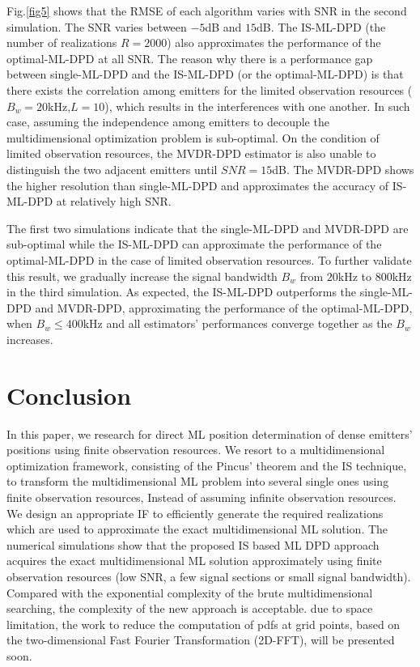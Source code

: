 \documentclass[review]{elsarticle}
\begin{document}
Fig.\ref{fig5} shows that the RMSE of each algorithm varies with SNR in the second simulation. The SNR varies between $-5$dB and $15$dB. The IS-ML-DPD (the number of realizations $R=2000$) also approximates the performance of the optimal-ML-DPD at all SNR. The reason why there is a performance gap between single-ML-DPD and the IS-ML-DPD (or the optimal-ML-DPD) is that there exists the correlation among emitters for the limited observation resources ($B_w=20$kHz,$L=10$), which results in the interferences with one another. In such case, assuming the independence among emitters to decouple the multidimensional optimization problem is sub-optimal. On the condition of limited observation resources, the MVDR-DPD estimator is also unable to distinguish the two adjacent emitters until $SNR= 15$dB. The MVDR-DPD shows the higher resolution than single-ML-DPD and approximates the accuracy of IS-ML-DPD at relatively high SNR.

The first two simulations indicate that the single-ML-DPD and MVDR-DPD are sub-optimal while the IS-ML-DPD can approximate the performance of the optimal-ML-DPD in the case of limited observation resources. To further validate this result, we gradually increase the signal bandwidth $B_w$ from $20$kHz to $800$kHz in the third simulation. As expected, the IS-ML-DPD outperforms the single-ML-DPD and MVDR-DPD, approximating the performance of the optimal-ML-DPD, when $B_w\leq400$kHz and all estimators' performances converge together as the $B_w$ increases.

\section{Conclusion}
In this paper, we research for direct ML position determination of dense emitters' positions using finite observation resources. We resort to a multidimensional optimization framework, consisting of the Pincus' theorem \cite{Pincus1968A} and the IS technique, to transform the multidimensional ML problem into several single ones using finite observation resources, Instead of assuming infinite observation resources. We design an appropriate IF to efficiently generate the required realizations which are used to approximate the exact multidimensional ML solution. The numerical simulations show that the proposed IS based ML DPD approach acquires the exact multidimensional ML solution approximately using finite observation resources (low SNR, a few signal sections or small signal bandwidth). Compared with the exponential complexity of the brute multidimensional searching, the complexity of the new approach is acceptable. due to space limitation, the work to reduce the computation of pdfs at grid points, based on the two-dimensional Fast Fourier Transformation (2D-FFT), will be presented soon. 
\end{document}

